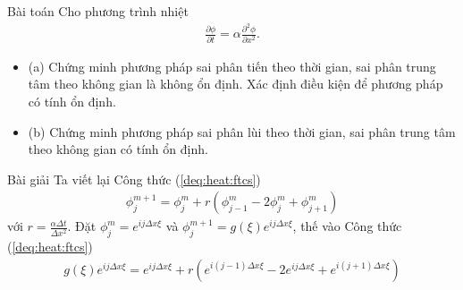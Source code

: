 \documentclass[9pt]{beamer}
\numberwithin{equation}{section}
\begin{document}
\begin{frame}
\begin{block}{Bài toán}
    Cho phương trình nhiệt
    \begin{align*}
        \frac{\partial \phi}{\partial t} = \alpha \frac{\partial^2 \phi}{\partial x^2}.
    \end{align*}
    \begin{itemize}
        \item (a) Chứng minh phương pháp sai phân tiến theo thời gian, sai phân trung tâm theo không gian là không ổn định. Xác định điều kiện để phương pháp có tính ổn định.
        \item (b) Chứng minh phương pháp sai phân lùi theo thời gian, sai phân trung tâm theo không gian có tính ổn định.
    \end{itemize}
\end{block}

\begin{exampleblock}{Bài giải}
    Ta viết lại Công thức (\ref{deq:heat:ftcs})
    \begin{align*}
        \phi_j^{m+1} = \phi_j^m + r\left(\phi_{j-1}^m - 2\phi_j^m + \phi_{j+1}^m\right)
    \end{align*}
    với $r = \frac{\alpha \Delta t}{\Delta x^2}$.
    Đặt $\phi_j^m = e^{ij\Delta x \xi}$ và $\phi_j^{m+1} = g(\xi) e^{ij\Delta x \xi}$, thế vào Công thức (\ref{deq:heat:ftcs})
    \begin{align*}
        g(\xi) e^{ij\Delta x \xi} = e^{ij\Delta x \xi} + r\left(e^{i(j-1)\Delta x \xi} - 2e^{ij\Delta x \xi} + e^{i(j+1)\Delta x \xi}\right)
    \end{align*}
\end{exampleblock}
\end{frame}
\end{document}
